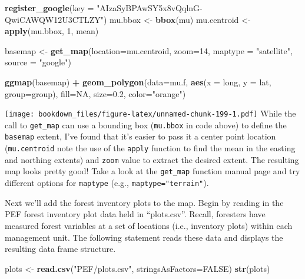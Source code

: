 \documentclass[
]{krantz}
\makeatletter
\newenvironment{Shaded}{\begin{snugshade}}{\end{snugshade}}
\newcommand{\DataTypeTok}[1]{\textcolor[rgb]{0.27,0.27,0.27}{#1}}
\newcommand{\DecValTok}[1]{\textcolor[rgb]{0.06,0.06,0.06}{#1}}
\newcommand{\FloatTok}[1]{\textcolor[rgb]{0.06,0.06,0.06}{#1}}
\newcommand{\KeywordTok}[1]{\textcolor[rgb]{0.27,0.27,0.27}{\textbf{#1}}}
\newcommand{\NormalTok}[1]{#1}
\newcommand{\OperatorTok}[1]{\textcolor[rgb]{0.43,0.43,0.43}{\textbf{#1}}}
\newcommand{\OtherTok}[1]{\textcolor[rgb]{0.37,0.37,0.37}{#1}}
\newcommand{\StringTok}[1]{\textcolor[rgb]{0.5,0.5,0.5}{#1}}
\newenvironment{kframe}{%
\medskip{}
\setlength{\fboxsep}{.8em}
 \def\at@end@of@kframe{}%
 \ifinner\ifhmode%
  \def\at@end@of@kframe{\end{minipage}}%
  \begin{minipage}{\columnwidth}%
 \fi\fi%
 \def\FrameCommand##1{\hskip\@totalleftmargin \hskip-\fboxsep
 \colorbox{shadecolor}{##1}\hskip-\fboxsep
     \hskip-\linewidth \hskip-\@totalleftmargin \hskip\columnwidth}%
 \MakeFramed {\advance\hsize-\width
   \@totalleftmargin\z@ \linewidth\hsize
   \@setminipage}}%
 {\par\unskip\endMakeFramed%
 \at@end@of@kframe}
\renewenvironment{Shaded}{\begin{kframe}}{\end{kframe}}
\makeatother
\begin{document}
\begin{Shaded}
\begin{Highlighting}[]
\KeywordTok{register\_google}\NormalTok{(}\DataTypeTok{key =} \StringTok{"AIzaSyBPAwSY5x8vQqlnG{-}QwiCAWQW12U3CTLZY"}\NormalTok{)}
\NormalTok{mu.bbox \textless{}{-}}\StringTok{ }\KeywordTok{bbox}\NormalTok{(mu)}
\NormalTok{mu.centroid \textless{}{-}}\StringTok{ }\KeywordTok{apply}\NormalTok{(mu.bbox, }\DecValTok{1}\NormalTok{, mean)}

\NormalTok{basemap \textless{}{-}}\StringTok{ }\KeywordTok{get\_map}\NormalTok{(}\DataTypeTok{location=}\NormalTok{mu.centroid, }\DataTypeTok{zoom=}\DecValTok{14}\NormalTok{, }\DataTypeTok{maptype =} \StringTok{"satellite"}\NormalTok{, }\DataTypeTok{source =} \StringTok{"google"}\NormalTok{)}
                                    
\KeywordTok{ggmap}\NormalTok{(basemap) }\OperatorTok{+}\StringTok{ }
\StringTok{  }\KeywordTok{geom\_polygon}\NormalTok{(}\DataTypeTok{data=}\NormalTok{mu.f, }\KeywordTok{aes}\NormalTok{(}\DataTypeTok{x =}\NormalTok{ long, }\DataTypeTok{y =}\NormalTok{ lat, }\DataTypeTok{group=}\NormalTok{group), }
                 \DataTypeTok{fill=}\OtherTok{NA}\NormalTok{, }\DataTypeTok{size=}\FloatTok{0.2}\NormalTok{, }\DataTypeTok{color=}\StringTok{"orange"}\NormalTok{)}
\end{Highlighting}
\end{Shaded}

\texttt{[image: bookdown\_files/figure-latex/unnamed-chunk-199-1.pdf]}
While the call to \texttt{get\_map} can use a bounding box (\texttt{mu.bbox} in code above) to define the \texttt{basemap} extent, I've found that it's easier to pass it a center point location (\texttt{mu.centroid} note the use of the \texttt{apply} function to find the mean in the easting and northing extents) and \texttt{zoom} value to extract the desired extent. The resulting map looks pretty good! Take a look at the \texttt{get\_map} function manual page and try different options for \texttt{maptype} (e.g., \texttt{maptype="terrain"}).

Next we'll add the forest inventory plots to the map. Begin by reading in the PEF forest inventory plot data held in ``plots.csv''. Recall, foresters have measured forest variables at a set of locations (i.e., inventory plots) within each management unit. The following statement reads these data and displays the resulting data frame structure.

\begin{Shaded}
\begin{Highlighting}[]
\NormalTok{plots \textless{}{-}}\StringTok{ }\KeywordTok{read.csv}\NormalTok{(}\StringTok{"PEF/plots.csv"}\NormalTok{, }\DataTypeTok{stringsAsFactors=}\OtherTok{FALSE}\NormalTok{)}
\KeywordTok{str}\NormalTok{(plots)}
\end{Highlighting}
\end{Shaded}
\end{document}

